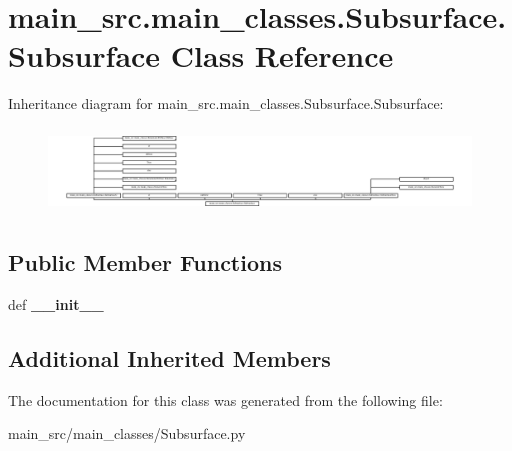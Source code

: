 \hypertarget{classmain__src_1_1main__classes_1_1Subsurface_1_1Subsurface}{\section{main\-\_\-src.\-main\-\_\-classes.\-Subsurface.\-Subsurface Class Reference}
\label{classmain__src_1_1main__classes_1_1Subsurface_1_1Subsurface}
}
Inheritance diagram for main\-\_\-src.\-main\-\_\-classes.\-Subsurface.\-Subsurface\-:\begin{figure}[H]
\begin{center}
\leavevmode
\includegraphics[height=2.285714cm]{classmain__src_1_1main__classes_1_1Subsurface_1_1Subsurface}
\end{center}
\end{figure}
\subsection*{Public Member Functions}
\begin{DoxyCompactItemize}
\item 
\hypertarget{classmain__src_1_1main__classes_1_1Subsurface_1_1Subsurface_a013ca707cb3e9591e2f478cc8310bb7d}{def {\bfseries \-\_\-\-\_\-init\-\_\-\-\_\-}}\label{classmain__src_1_1main__classes_1_1Subsurface_1_1Subsurface_a013ca707cb3e9591e2f478cc8310bb7d}

\end{DoxyCompactItemize}
\subsection*{Additional Inherited Members}


The documentation for this class was generated from the following file\-:\begin{DoxyCompactItemize}
\item 
main\-\_\-src/main\-\_\-classes/Subsurface.\-py\end{DoxyCompactItemize}

